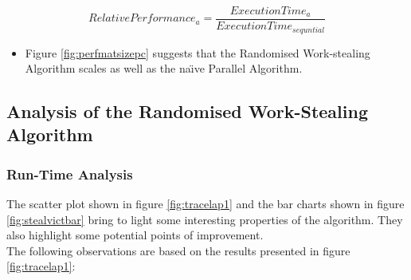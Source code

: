 \[ RelativePerformance_a = \frac{ExecutionTime_a}{ExecutionTime_{sequntial}}\]

\begin{itemize}
\item Figure \ref{fig:perfmatsizepc} suggests that the Randomised Work-stealing Algorithm scales as 
      well as the na\"{\i}ve Parallel Algorithm. 
\end{itemize}




\subsection{Analysis of the Randomised Work-Stealing Algorithm}

\subsubsection*{Run-Time Analysis}

The scatter plot shown in figure \ref{fig:tracelap1} and the bar charts shown in figure \ref{fig:stealvictbar} 
bring to light some interesting properties of the algorithm.
They also highlight some potential points of improvement.
\\



The following observations are based on the results presented in figure \ref{fig:tracelap1}:

